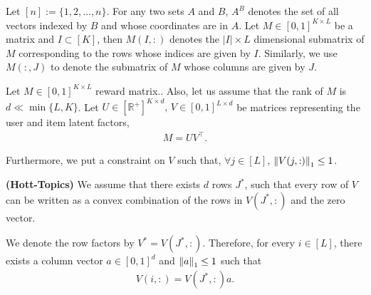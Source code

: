 Let $[n] := \lbrace 1,2,\ldots, n\rbrace$. For any two sets $A$ and $B$, $A^B$ denotes the set of all vectors indexed by $B$ and whose coordinates are in $A$. Let $M\in [0,1]^{K\times L}$ be a matrix and $I \subset [K] $, then $M(I,:)$ denotes the $|I| \times L$ dimensional submatrix of $M$ corresponding to the rows whose indices are given by $I$. Similarly, we use $M(:,J)$ to denote the submatrix of $M$ whose columns are given by $J$.
	
	Let $M \in  [0,1]^{K \times L}$  reward matrix.. Also, let us assume that the rank of  $M$ is $d \ll \min\lbrace L,K\rbrace$. Let $ U \in [ \mathbb{R}^+ ]^{K\times d} \textbf{, } V \in  [0,1]^{L\times d}$ be matrices representing the user and item latent factors, 
\begin{align*}
	M = UV^{\intercal} .
\end{align*}	  
	
	
	Furthermore, we put a constraint on $V$ such that, $\forall j\in [L]$, $ \left\lVert V(j,:)\right\rVert_1 \leq 1$. 
	
	
\begin{assumption}\textbf{(Hott-Topics)}
\label{assm:hott-topics}
We assume that there exists $d$ rows $J^*$,  such that every row of $V$ can be written as a convex combination of the rows in $V(J^*,:)$ and the zero vector. 
\end{assumption}
We denote the row factors by $V^* = V(J^*,:)$. Therefore, for every $i\in [L]$, there exists a column vector $a \in [0,1]^{d}$ and $ \left\lVert a\right\rVert_1 \leq 1$ such that 
\begin{align*}
V(i,:) = V(J^*,:) a.
\end{align*}




%
%
%

